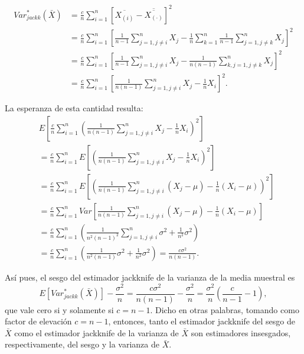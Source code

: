 \documentclass[
]{book}
\theoremstyle{break}
\theoremstyle{definition}
\theoremstyle{definition}
\theoremstyle{definition}
\theoremstyle{definition}
\theoremstyle{remark}
\begin{document}
\[\begin{aligned}
Var_{jackk}^{\ast}\left( \bar{X} \right) &= \frac{c}{n}\sum_{i=1}^{n}
\left[ \overline{X_{(i)}}-\overline{\overline{X_{\left( \cdot
 \right)}}}\right]^2 \\
&= \frac{c}{n}\sum_{i=1}^{n}\left[ \frac{1}{n-1}\sum_{j=1,j\neq i}^{n}X_j-
\frac{1}{n}\sum_{k=1}^{n}\frac{1}{n-1}\sum_{j=1,j\neq k}^{n}X_j\right]^2
\\
&= \frac{c}{n}\sum_{i=1}^{n}\left[ \frac{1}{n-1}\sum_{j=1,j\neq i}^{n}X_j-
\frac{1}{n\left( n-1 \right)}\sum_{k,j=1,j\neq k}^{n}X_j\right]^2 \\
&= \frac{c}{n}\sum_{i=1}^{n}\left[ \frac{1}{n\left( n-1 \right)}
\sum_{j=1,j\neq i}^{n}X_j-\frac{1}{n}X_i\right]^2.\end{aligned}\]

La esperanza de esta cantidad resulta:
\[\begin{aligned}
&E\left[ \frac{c}{n}\sum_{i=1}^{n}\left( \frac{1}{n\left( n-1 \right)}
\sum_{j=1,j\neq i}^{n}X_j-\frac{1}{n}X_i \right)^2\right] \\
&= \frac{c}{n}\sum_{i=1}^{n}E\left[ \left( \frac{1}{n\left( n-1 \right)}
\sum_{j=1,j\neq i}^{n}X_j-\frac{1}{n}X_i \right)^2\right] \\
&= \frac{c}{n}\sum_{i=1}^{n}E\left[ \left( \frac{1}{n\left( n-1 \right)}
\sum_{j=1,j\neq i}^{n}\left( X_j-\mu \right) 
-\frac{1}{n}\left( X_i-\mu \right) \right)^2\right] \\
&= \frac{c}{n}\sum_{i=1}^{n}Var\left[ \frac{1}{n\left( n-1 \right)}
\sum_{j=1,j\neq i}^{n}\left( X_j-\mu \right) 
-\frac{1}{n}\left( X_i-\mu \right) \right]\\
&= \frac{c}{n}\sum_{i=1}^{n}\left( \frac{1}{n^2\left( n-1 \right)^2}
\sum_{j=1,j\neq i}^{n}\sigma^2+\frac{1}{n^2}\sigma^2 \right) \\
&= \frac{c}{n}\sum_{i=1}^{n}\left( \frac{1}{n^2\left( n-1 \right)}\sigma^2+\frac{1}{n^2}\sigma^2 \right) 
=\frac{c\sigma^2}{n\left(n-1 \right)}.
\end{aligned}\]

Así pues, el sesgo del estimador jackknife de la varianza de la media
muestral es
\[E\left[ Var_{jackk}^{\ast}\left( \bar{X} \right) \right] -\frac{\sigma
^2}{n}=\frac{c\sigma^2}{n\left( n-1 \right)}-\frac{\sigma^2}{n}=
\frac{\sigma^2}{n}\left( \frac{c}{n-1}-1 \right),\]
que vale cero si y solamente si \(c=n-1\).
Dicho en otras palabras, tomando como factor de
elevación \(c=n-1\), entonces, tanto el estimador jackknife del sesgo de
\(\bar{X}\) como el estimador jackknife de la varianza de
\(\bar{X}\) son estimadores insesgados, respectivamente, del sesgo y
la varianza de \(\bar{X}\).
\end{document}
